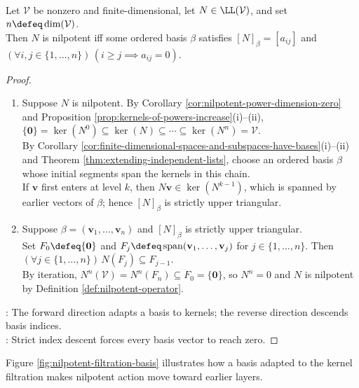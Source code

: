 \begin{theorem} \label{thm:nilpotent-strictly-upper-triangular-matrix} \\
Let $\mathcal{V}$ be nonzero and finite-dimensional, let $N\in\LL(\mathcal{V})$, and set $n\defeq\dim(\mathcal{V})$.\\
Then $N$ is nilpotent iff some ordered basis $\beta$ satisfies $[N]_{\beta}=[a_{ij}]$ and $(\forall i,j\in\{1,\ldots,n\})\,(i\geq j\implies a_{ij}=0)$.
\begin{proof}
\begin{enumerate}[label=\roman*.]
\setlength{\itemsep}{0pt}
\item[$(\Rightarrow)$] Suppose $N$ is nilpotent. By Corollary \ref{cor:nilpotent-power-dimension-zero} and Proposition \ref{prop:kernels-of-powers-increase}(i)--(ii), $\{\mathbf{0}\}=\ker(N^0)\subseteq\ker(N)\subseteq\cdots\subseteq\ker(N^n)=\mathcal{V}$.\\
By Corollary \ref{cor:finite-dimensional-spaces-and-subspaces-have-bases}(i)--(ii) and Theorem \ref{thm:extending-independent-lists}, choose an ordered basis $\beta$ whose initial segments span the kernels in this chain.\\
If $\mathbf{v}$ first enters at level $k$, then $N\mathbf{v}\in\ker(N^{k-1})$, which is spanned by earlier vectors of $\beta$; hence $[N]_{\beta}$ is strictly upper triangular.
\item[$(\Leftarrow)$] Suppose $\beta=(\mathbf{v}_1,\ldots,\mathbf{v}_n)$ and $[N]_{\beta}$ is strictly upper triangular.\\
Set $F_0\defeq\{\mathbf{0}\}$ and $F_j\defeq\operatorname{span}(\mathbf{v}_1,\ldots,\mathbf{v}_j)$ for $j\in\{1,\ldots,n\}$. Then $(\forall j\in\{1,\ldots,n\})\,N(F_j)\subseteq F_{j-1}$.\\
By iteration, $N^n(\mathcal{V})=N^n(F_n)\subseteq F_0=\{\mathbf{0}\}$, so $N^n=0$ and $N$ is nilpotent by Definition \ref{def:nilpotent-operator}.
\end{enumerate}
: The forward direction adapts a basis to kernels; the reverse direction descends basis indices.\\
: Strict index descent forces every basis vector to reach zero.
\end{proof}
\end{theorem}

Figure \ref{fig:nilpotent-filtration-basis} illustrates how a basis adapted to the kernel filtration makes nilpotent action move toward earlier layers.

